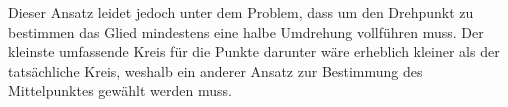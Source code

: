 Dieser Ansatz leidet jedoch unter dem Problem, dass um den Drehpunkt zu bestimmen das Glied mindestens eine halbe Umdrehung vollführen muss.
Der kleinste umfassende Kreis für die Punkte darunter wäre erheblich kleiner als der tatsächliche Kreis, weshalb ein anderer Ansatz zur Bestimmung des Mittelpunktes gewählt werden muss.



